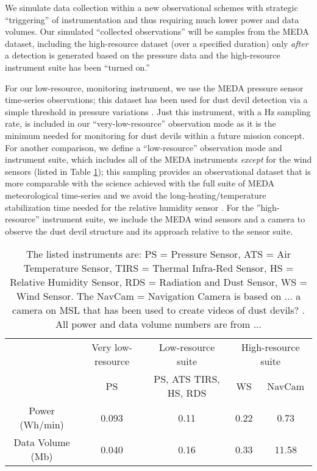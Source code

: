 We simulate data collection within a new observational schemes with strategic ``triggering'' of instrumentation and thus requiring much lower power and data volumes. 
Our simulated ``collected observations'' will be samples from the MEDA dataset, including the high-resource dataset (over a specified duration) only \emph{after} a detection is generated based on the pressure data and the high-resource instrument suite has been ``turned on.''

For our low-resource, monitoring instrument, we use the \gls{MEDA} pressure sensor time-series observations; this dataset has been used for dust devil detection via a simple threshold in pressure variations \citep{Jackson2022}. 
Just this instrument, with a \unit[1]{Hz} sampling rate, is included in our ``very-low-resource'' observation mode as it is the minimum needed for monitoring for dust devils within a future mission concept. 
For another comparison, we define a ``low-resource'' observation mode and instrument suite, which includes all of the \gls{MEDA} instruments \emph{except} for the wind sensors (listed in Table \ref{tab:PayloadModes}); this sampling provides an observational dataset that is more comparable with the science achieved with the full suite of \gls{MEDA} meteorological time-series and we avoid the long-heating/temperature stabilization time needed for the relative humidity sensor \cite{}.
For the ''high-resource'' instrument suite, we include the \gls{MEDA} wind sensors and a camera to observe the dust devil structure and its approach relative to the sensor suite.

\begin{table}[]
    \centering
    \begin{tabular}{c|c|c|c|c|}
        {} & {Very low-resource} & {Low-resource suite} & \multicolumn{2}{|c|}{High-resource suite} \\
        {} & PS & {PS, ATS TIRS, HS, RDS} & WS & NavCam  \\ \hline
        Power (Wh/min) & 0.093 & 0.11 & 0.22 & 0.73  \\ \hline 
        Data Volume (Mb) & 0.040 & 0.16 & 0.33 & 11.58  \\ \hline
    \end{tabular}
    \caption{The listed instruments are: PS = Pressure Sensor, ATS = Air Temperature Sensor, TIRS = Thermal Infra-Red Sensor, HS = Relative Humidity Sensor, RDS = Radiation and Dust Sensor, WS = Wind Sensor. The NavCam = Navigation Camera is based on ... a camera on MSL that has been used to create videos of dust devils? \cite{}. All power and data volume numbers are from ... }
    \label{tab:PayloadModes}
\end{table}




